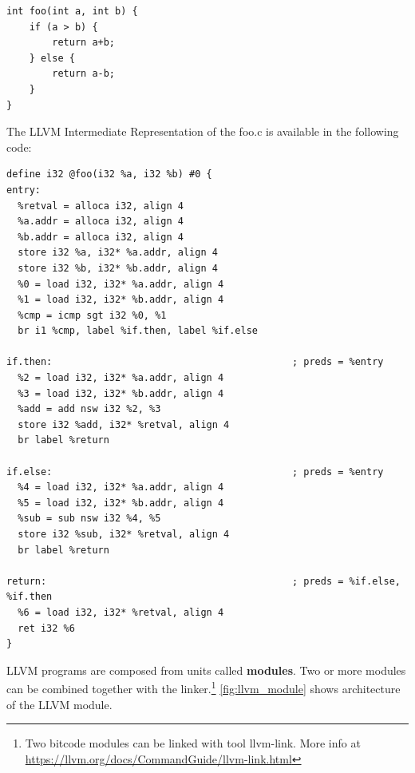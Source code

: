 \documentclass[12pt, twoside]{fithesis2}
\renewcommand{\_}{\leavevmode \kern0.07em\vbox{\hrule width0.4em}}
\begin{document}
\begin{verbatim}
int foo(int a, int b) {
    if (a > b) {
        return a+b;
    } else {
        return a-b;
    }
}
\end{verbatim}

The LLVM Intermediate Representation of the foo.c is available in the following
code:

\begin{verbatim}
define i32 @foo(i32 %a, i32 %b) #0 {
entry:
  %retval = alloca i32, align 4
  %a.addr = alloca i32, align 4
  %b.addr = alloca i32, align 4
  store i32 %a, i32* %a.addr, align 4
  store i32 %b, i32* %b.addr, align 4
  %0 = load i32, i32* %a.addr, align 4
  %1 = load i32, i32* %b.addr, align 4
  %cmp = icmp sgt i32 %0, %1
  br i1 %cmp, label %if.then, label %if.else

if.then:                                          ; preds = %entry
  %2 = load i32, i32* %a.addr, align 4
  %3 = load i32, i32* %b.addr, align 4
  %add = add nsw i32 %2, %3
  store i32 %add, i32* %retval, align 4
  br label %return

if.else:                                          ; preds = %entry
  %4 = load i32, i32* %a.addr, align 4
  %5 = load i32, i32* %b.addr, align 4
  %sub = sub nsw i32 %4, %5
  store i32 %sub, i32* %retval, align 4
  br label %return

return:                                           ; preds = %if.else, %if.then
  %6 = load i32, i32* %retval, align 4
  ret i32 %6
}
\end{verbatim}

LLVM programs are composed from units called \textbf{modules}. Two or more
modules can be combined together with the linker.\footnote{
Two bitcode modules can be linked with tool llvm-link. More info at
\url{https://llvm.org/docs/CommandGuide/llvm-link.html}
}
\autoref{fig:llvm_module} shows architecture of the LLVM module.
\end{document}
